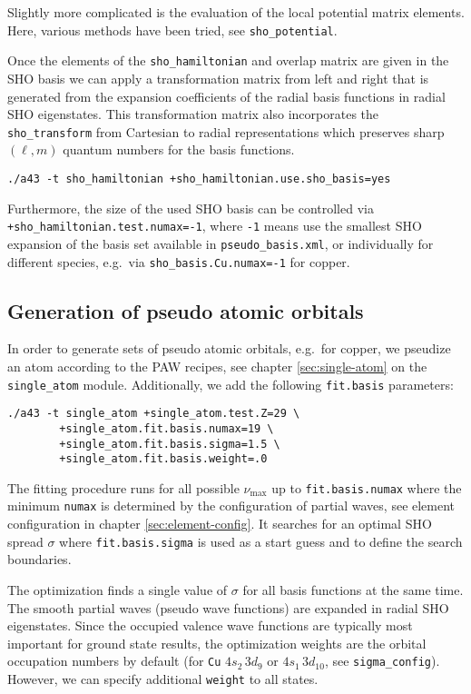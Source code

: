 \documentclass[oribibl]{llncs}
\newcommand{\um}[1]{_{\mathrm{#1}}}
\newcommand{\ttt}[1]{\texttt{#1}}
\begin{document}
Slightly more complicated is the evaluation of the local potential matrix elements.
Here, various methods have been tried, see \ttt{sho\_potential}.

Once the elements of the \ttt{sho\_hamiltonian} and overlap matrix are given in the \ac{SHO} basis
we can apply a transformation matrix from left and right that is generated from the expansion
coefficients of the radial basis functions in radial \ac{SHO} eigenstates.
This transformation matrix also incorporates the \ttt{sho\_transform} from Cartesian to radial
representations which preserves sharp $(\ell,m)$ quantum numbers for the basis functions.

\begin{verbatim}
./a43 -t sho_hamiltonian +sho_hamiltonian.use.sho_basis=yes
\end{verbatim}

\noindent
Furthermore, the size of the used \ac{SHO} basis can be controlled via \ttt{+sho\_hamiltonian.test.numax=-1},
where \ttt{-1} means use the smallest \ac{SHO} expansion of the basis set available in \ttt{pseudo\_basis.xml}, or
individually for different species, e.g.~via \ttt{sho\_basis.Cu.numax=-1} for copper.

\subsection{Generation of pseudo atomic orbitals}
In order to generate sets of pseudo atomic orbitals, e.g.~for copper, we pseudize an atom according to the \ac{PAW} recipes, see chapter \ref{sec:single-atom} on the \ttt{single\_atom} module.
Additionally, we add the following \ttt{fit.basis} parameters:
\begin{verbatim}
./a43 -t single_atom +single_atom.test.Z=29 \
        +single_atom.fit.basis.numax=19 \
        +single_atom.fit.basis.sigma=1.5 \
        +single_atom.fit.basis.weight=.0 
\end{verbatim}
The fitting procedure runs for all possible $\nu\um{max}$ up to \ttt{fit.basis.numax}
where the minimum \ttt{numax} is determined by the configuration of partial waves, see element configuration in chapter \ref{sec:element-config}. 
It searches for an optimal \ac{SHO} spread $\sigma$ where \ttt{fit.basis.sigma} is used as a start guess and to define the search boundaries.

The optimization finds a single value of $\sigma$ for all basis functions at the same time.
The smooth partial waves (pseudo wave functions) are expanded in radial \ac{SHO} eigenstates.
Since the occupied valence wave functions are typically most important for ground state results,
the optimization weights are the orbital occupation numbers by default 
(for \ttt{Cu} $4s_{2} \, 3d_{9}$ or $4s_{1} \, 3d_{10}$, see \ttt{sigma\_config}).
However, we can specify additional \ttt{weight} to all states.
\end{document}
